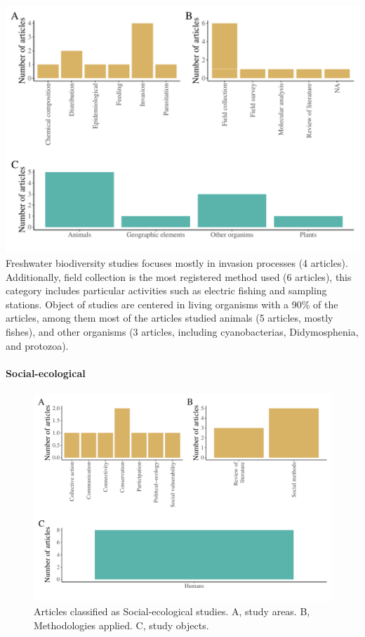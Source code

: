 \documentclass[]{article}
\let\oldparagraph\paragraph
\renewcommand{\paragraph}[1]{\oldparagraph{#1}\mbox{}}
\begin{document}
\includegraphics{Review_and_climate_files/figure-latex/Fresh-1.pdf}
Freshwater biodiversity studies focuses mostly in invasion processes (4 articles). Additionally, field collection is the most registered method used (6 articles), this category includes particular activities such as electric fishing and sampling stations.
Object of studies are centered in living organisms with a 90\% of the articles, among them most of the articles studied animals (5 articles, mostly fishes), and other organisms (3 articles, including cyanobacterias, Didymosphenia, and protozoa).

\hypertarget{social-ecological}{%
\paragraph{Social-ecological}\label{social-ecological}}

\begin{figure}
\centering
\includegraphics{Review_and_climate_files/figure-latex/Social-1.pdf}
\caption{\label{fig:Social}Articles classified as Social-ecological studies. A, study areas. B, Methodologies applied. C, study objects.}
\end{figure}
\end{document}
